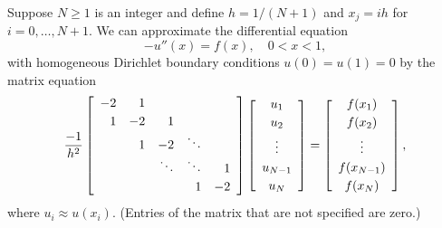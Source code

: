 

Suppose $N\ge 1$ is an integer and define $h = 1/(N+1)$ and $x_j = ih$ for $i=0,\ldots, N+1$. We can approximate the differential equation
\[
-u''(x) = f(x), \quad 0<x<1,
\]
with homogeneous Dirichlet boundary conditions $u(0)=u(1) = 0$ by the matrix equation
\[
{-1 \over h^2} \left[\begin{array}{rrrrr}
              -2 & 1 \\[0.25em]
               1 & -2 & 1 \\
                 &  1  & -2 & \ddots \\
                 & & \ddots & \ddots & 1 \\[0.25em]
                 & & & 1 & -2 
               \end{array}\right]
          \left[\begin{array}{c} u_1 \\[0.25em] u_2 \\[0.25em] \vdots \\[0.25em] u_{N-1} \\[0.25em] u_N \end{array}\right]
 =   \left[\begin{array}{c} f(x_1) \\[0.25em] f(x_2) \\[0.25em] \vdots \\[0.25em] f(x_{N-1}) \\[0.25em] f(x_N) \end{array}\right],
\]
where $u_i \approx u(x_i)$.  (Entries of the matrix that are not specified are zero.)
